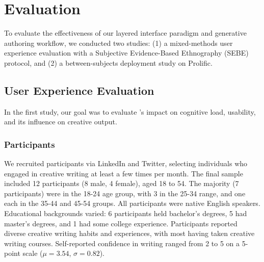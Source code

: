 \section{Evaluation}

To evaluate the effectiveness of our layered interface paradigm and generative authoring workflow, we conducted two studies: (1) a mixed-methods user experience evaluation with a Subjective Evidence-Based Ethnography (SEBE) protocol, and (2) a between-subjects deployment study on Prolific.

\subsection{User Experience Evaluation}

In the first study, our goal was to evaluate \system's impact on cognitive load, usability, and its influence on creative output. 

\subsubsection{Participants}
We recruited participants via LinkedIn and Twitter, selecting individuals who engaged in creative writing at least a few times per month. The final sample included 12 participants (8 male, 4 female), aged 18 to 54. The majority (7 participants) were in the 18-24 age group, with 3 in the 25-34 range, and one each in the 35-44 and 45-54 groups. All participants were native English speakers. Educational backgrounds varied: 6 participants held bachelor's degrees, 5 had master's degrees, and 1 had some college experience. Participants reported diverse creative writing habits and experiences, with most having taken creative writing courses. Self-reported confidence in writing ranged from 2 to 5 on a 5-point scale ($\mu = 3.54$, $\sigma = 0.82$).

